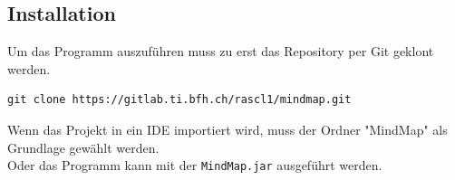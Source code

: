 \subsection{Installation}
Um das Programm auszuführen muss zu erst das Repository per Git geklont werden.
\begin{verbatim}
git clone https://gitlab.ti.bfh.ch/rascl1/mindmap.git
\end{verbatim}
Wenn das Projekt in ein IDE importiert wird, muss der Ordner "{}MindMap"{} als Grundlage gewählt werden.\\
Oder das Programm kann mit der \texttt{MindMap.jar} ausgeführt werden.